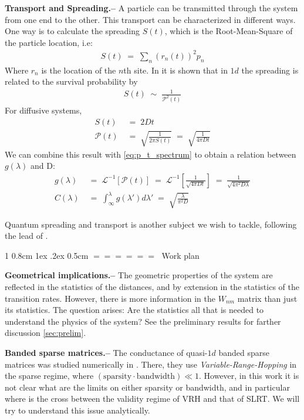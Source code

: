 \documentclass[onecolumn,fleqn,notitlepage,secnumarabic]{revtex4}
\makeatletter
\def\section{%
  \@startsection
    {section}%
    {1}%
    {\z@}%
    {0.8cm \@plus1ex \@minus .2ex}%
    {0.5cm}%
    {\Large\bf $=\!=\!=\!=\!=\!=\;$}%
}%
\makeatother
\begin{document}
{ \bf Transport and Spreading.--}  %
A particle can be transmitted through the system from one end to the other. This transport can be characterized in different ways. One way is to calculate the spreading $S(t)$, which is the Root-Mean-Square of the particle location, i.e:
\begin{align}
  S(t) \;=\; \sum_n (r_n(t)  )^2 p_n  %
\end{align}
Where $r_n$ is the location of the $n$th site. In \cite{Alexander:1981:RMP} it is shown that in $1d$ the spreading is related to the survival probability by
\begin{align}
S(t) \;\sim\; \frac{1}{\mathcal{P}^2(t)}
\end{align}
For diffusive systems, 
\begin{align}
S(t) &\;=\; 2Dt  \\
\mathcal{P}(t) &\;=\; \sqrt{\frac{1}{2\pi S(t)}} \;=\; \sqrt{\frac{1}{4\pi D t}}
\end{align}
We can combine this result with \autoref{eq:p_t_spectrum} to obtain a relation between $g(\lambda)$ and D:
\begin{align}
    g(\lambda) &\;=\; \mathcal{L}^{-1}[\mathcal{P}(t)] \;=\; \mathcal{L}^{-1}\left[\frac{1}{\sqrt{4\pi D t}}\right] \;=\; \frac{1}{\sqrt{4\pi^2 D\lambda}} \\
    C(\lambda) &\;=\; \int_{\infty}^{\lambda} g(\lambda')d\lambda' \;=\; \sqrt{\frac{\lambda}{\pi^2 D}} \label{eq:C_D}
\end{align}


Quantum spreading and transport is another subject we wish to tackle, following the lead of \cite{Jayannavar:1991}\cite{Guarneri:1989}\cite{Guarneri:1993}.


\section{Work plan}


{ \bf Geometrical implications.-- } The geometric properties of the system are reflected in the statistics of the distances, and by extension in the statistics of the transition rates. However, there is more information in the $W_{nm}$ matrix than just its statistics. The question arises: Are the statistics all that is needed to understand the physics of the system? See the preliminary results for farther discussion \ref{sec:prelim}.

{ \bf Banded sparse matrices.-- } The conductance of quasi-$1d$ banded sparse matrices was studied numerically in \cite{Stotland:2010:PRB}. There, they use \emph{Variable-Range-Hopping} in the sparse regime, where 
$(\text{sparsity}\cdot \text{bandwidth}) \ll 1$. However, in this work it is not clear what are the limits on either sparsity or bandwidth, and in particular where is the cross between the validity regime of VRH and that of SLRT. We will try to understand this issue analytically.
\end{document}
